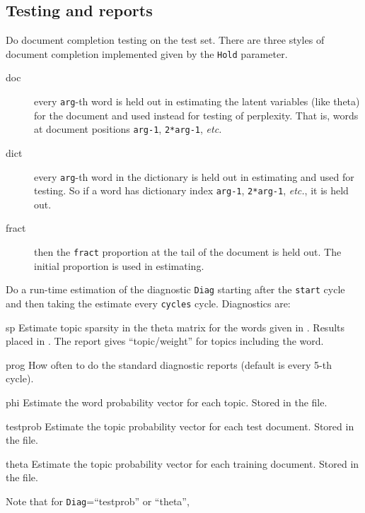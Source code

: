 \documentclass[a4paper,english]{article}
\begin{document}
\subsection{Testing and reports}
\begin{Description}\setlength{\itemsep}{0cm}
\item[\OptArg{-h}{Hold,arg}] 
Do document completion testing on the test set.
There are three styles of document completion implemented
given by the \texttt{Hold} parameter.
\begin{description}
\item[doc] every \texttt{arg}-th
word is held out in estimating the latent variables (like theta)
for the document and used instead for testing of perplexity.
That is, words at document positions \texttt{arg-1}, \texttt{2*arg-1}, 
\emph{etc.}
\item[dict] every \texttt{arg}-th
word in the dictionary is held out in estimating
and used for testing.  So if a word has dictionary index 
\texttt{arg-1}, \texttt{2*arg-1}, \emph{etc.}, it is held out.
\item[fract] then the \texttt{fract}
proportion at the tail of the document is held out.  
The initial proportion is used in estimating.
\end{description}
\item[\OptArg{-l}{Diag,cycles,start}] 
Do a run-time estimation of the diagnostic \texttt{Diag}
starting after the \texttt{start} cycle and then taking the
estimate every \texttt{cycles} cycle.
Diagnostics are:
\begin{Description}[testprob]\setlength{\itemsep}{0cm}
\item[sp] 
Estimate topic sparsity in the theta matrix for the
words given in .
Results placed in .
The report gives ``topic/weight'' for topics including the word.
\item[prog] 
How often to do the standard diagnostic reports
(default is every 5-th cycle).
\item[phi] 
Estimate the word probability vector for each topic.
Stored in the  file.
\item[testprob] 
Estimate the topic probability vector for each test document.  
Stored in the  file.
\item[theta] 
Estimate the topic probability vector for each training document.
Stored in the  file.
\end{Description}
Note that for \texttt{Diag}=``testprob'' or ``theta'',

\end{Description}
\end{document}
